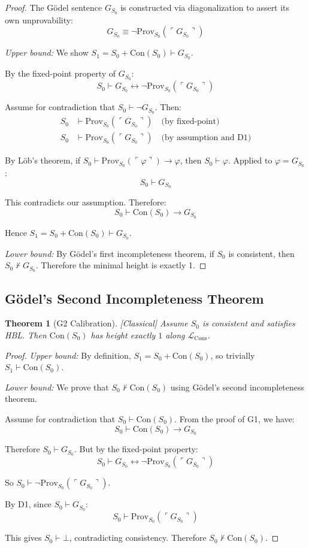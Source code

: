 \documentclass[11pt]{article}
\newtheorem{theorem}{Theorem}[section]
\newcommand{\Con}{\mathrm{Con}}
\newcommand{\LCons}{\mathcal{L}_{\mathrm{Cons}}}
\newcommand{\Prov}{\mathrm{Prov}}
\newcommand{\leancited}{\textsf{\textcolor{blue!70!black}{[Classical]}}}
\begin{document}
\begin{proof}
The Gödel sentence $G_{S_0}$ is constructed via diagonalization to assert its own unprovability:
$$G_{S_0} \equiv \neg\Prov_{S_0}(\ulcorner G_{S_0} \urcorner)$$

\emph{Upper bound:} We show $S_1 = S_0 + \Con(S_0) \vdash G_{S_0}$.

By the fixed-point property of $G_{S_0}$:
$$S_0 \vdash G_{S_0} \leftrightarrow \neg\Prov_{S_0}(\ulcorner G_{S_0} \urcorner)$$

Assume for contradiction that $S_0 \vdash \neg G_{S_0}$. Then:
\begin{align}
S_0 &\vdash \Prov_{S_0}(\ulcorner G_{S_0} \urcorner) \quad \text{(by fixed-point)} \\
S_0 &\vdash \Prov_{S_0}(\ulcorner G_{S_0} \urcorner) \quad \text{(by assumption and D1)}
\end{align}

By Löb's theorem, if $S_0 \vdash \Prov_{S_0}(\ulcorner \varphi \urcorner) \to \varphi$, then $S_0 \vdash \varphi$. Applied to $\varphi = G_{S_0}$:
$$S_0 \vdash G_{S_0}$$

This contradicts our assumption. Therefore:
$$S_0 \vdash \Con(S_0) \to G_{S_0}$$

Hence $S_1 = S_0 + \Con(S_0) \vdash G_{S_0}$.

\emph{Lower bound:} By Gödel's first incompleteness theorem, if $S_0$ is consistent, then $S_0 \nvdash G_{S_0}$. Therefore the minimal height is exactly 1.
\end{proof}

\subsection{Gödel's Second Incompleteness Theorem}

\begin{theorem}[G2 Calibration] \leancited
Assume $S_0$ is consistent and satisfies HBL. Then $\Con(S_0)$ has height exactly $1$ along $\LCons$.
\end{theorem}

\begin{proof}
\emph{Upper bound:} By definition, $S_1 = S_0 + \Con(S_0)$, so trivially $S_1 \vdash \Con(S_0)$.

\emph{Lower bound:} We prove that $S_0 \nvdash \Con(S_0)$ using Gödel's second incompleteness theorem.

Assume for contradiction that $S_0 \vdash \Con(S_0)$. From the proof of G1, we have:
$$S_0 \vdash \Con(S_0) \to G_{S_0}$$

Therefore $S_0 \vdash G_{S_0}$. But by the fixed-point property:
$$S_0 \vdash G_{S_0} \leftrightarrow \neg\Prov_{S_0}(\ulcorner G_{S_0} \urcorner)$$

So $S_0 \vdash \neg\Prov_{S_0}(\ulcorner G_{S_0} \urcorner)$.

By D1, since $S_0 \vdash G_{S_0}$:
$$S_0 \vdash \Prov_{S_0}(\ulcorner G_{S_0} \urcorner)$$

This gives $S_0 \vdash \bot$, contradicting consistency. Therefore $S_0 \nvdash \Con(S_0)$.
\end{proof}
\end{document}
